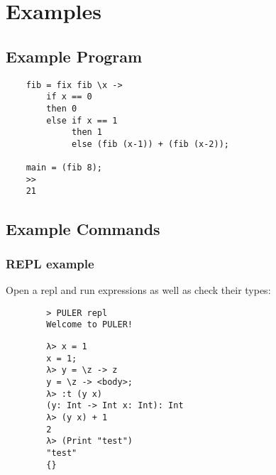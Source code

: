 \chapter{Examples}
\label{examples}
\thispagestyle{myheadings}


\section{Example Program}
\begin{verbatim}
    fib = fix fib \x ->
        if x == 0
        then 0
        else if x == 1
             then 1
             else (fib (x-1)) + (fib (x-2));
    
    main = (fib 8);
    >>
    21
\end{verbatim}

\section{Example Commands}
    \subsection{REPL example}
    Open a repl and run expressions as well as check their types:
    \begin{verbatim}
        > PULER repl
        Welcome to PULER!
    \end{verbatim}
    \begin{verbatim}
        λ> x = 1
        x = 1;
        λ> y = \z -> z
        y = \z -> <body>;
        λ> :t (y x)
        (y: Int -> Int x: Int): Int
        λ> (y x) + 1
        2
        λ> (Print "test")
        "test"
        {}
    \end{verbatim}

    
